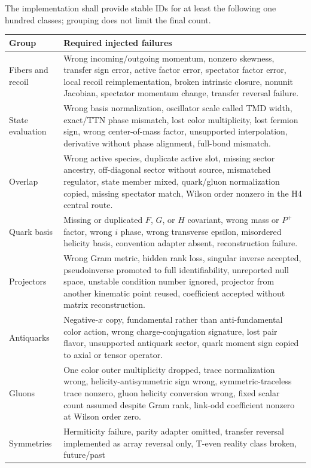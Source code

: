 \documentclass[11pt]{article}
\begin{document}
The implementation shall provide stable IDs for at least the following one
hundred classes; grouping does not limit the final count.

\begin{longtable}{L{0.18\textwidth}L{0.72\textwidth}}
\toprule
Group & Required injected failures\\
\midrule
\endhead
Fibers and recoil & Wrong incoming/outgoing momentum, nonzero skewness,
transfer sign error, active factor error, spectator factor error, local recoil
reimplementation, broken intrinsic closure, nonunit Jacobian, spectator
momentum change, transfer reversal failure.\\
State evaluation & Wrong basis normalization, oscillator scale called TMD
width, exact/TTN phase mismatch, lost color multiplicity, lost fermion sign,
wrong center-of-mass factor, unsupported interpolation, derivative without
phase alignment, full-bond mismatch.\\
Overlap & Wrong active species, duplicate active slot, missing sector ancestry,
off-diagonal sector without source, mismatched regulator, state member mixed,
quark/gluon normalization copied, missing spectator match, Wilson order
nonzero in the H4 central route.\\
Quark basis & Missing or duplicated \(F\), \(G\), or \(H\) covariant, wrong
mass or \(P^+\) factor, wrong \(i\) phase, wrong transverse epsilon,
misordered helicity basis, convention adapter absent, reconstruction failure.\\
Projectors & Wrong Gram metric, hidden rank loss, singular inverse accepted,
pseudoinverse promoted to full identifiability, unreported null space, unstable
condition number ignored, projector from another kinematic point reused,
coefficient accepted without matrix reconstruction.\\
Antiquarks & Negative-\(x\) copy, fundamental rather than anti-fundamental
color action, wrong charge-conjugation signature, lost pair flavor, unsupported
antiquark sector, quark moment sign copied to axial or tensor operator.\\
Gluons & One color outer multiplicity dropped, trace normalization wrong,
helicity-antisymmetric sign wrong, symmetric-traceless trace nonzero, gluon
helicity conversion wrong, fixed scalar count assumed despite Gram rank,
link-odd coefficient nonzero at Wilson order zero.\\
Symmetries & Hermiticity failure, parity adapter omitted, transfer reversal
implemented as array reversal only, T-even reality class broken, future/past

\end{longtable}
\end{document}

